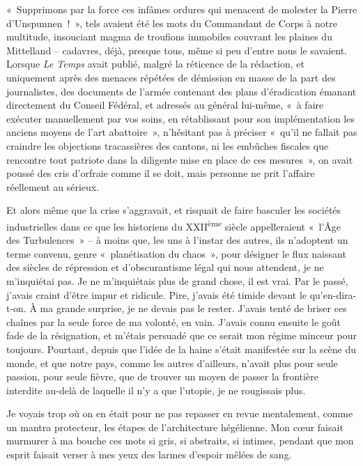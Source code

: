\documentclass[
  extrafontsizes,
  oneside,
  14pt
]{memoir}
\begin{document}
«~Supprimons par la force ces infâmes ordures qui menacent de molester la
Pierre d'Unspunnen~!~», tels avaient été les mots du Commandant de Corps à
notre multitude, insouciant magma de troufions immobiles couvrant les plaines
du Mittelland -- cadavres, déjà, presque tous, même si peu d'entre nous le
savaient. Lorsque \emph{Le Temps} avait publié, malgré la réticence de la
rédaction, et uniquement après des menaces répétées de démission en masse de la
part des journalistes, des documents de l'armée contenant des plans
d'éradication émanant directement du Conseil Fédéral, et adressés au général
lui-même, «~à faire exécuter manuellement par vos soins, en rétablissant pour
son implémentation les anciens moyens de l'art abattoire~», n'hésitant pas à
préciser «~qu'il ne fallait pas craindre les objections tracassières des
cantons, ni les embûches fiscales que rencontre tout patriote dans la diligente
mise en place de ces mesures~», on avait poussé des cris d'orfraie comme il se
doit, mais personne ne prit l'affaire réellement au sérieux.

Et alors même que la crise s'aggravait, et risquait de faire basculer les
sociétés industrielles dans ce que les historiens du XXII\textsuperscript{ème}
siècle appelleraient «~l'Âge des Turbulences~» -- à moins que, les uns à
l'instar des autres, ils n'adoptent un terme convenu, genre «~planétisation du
chaos~», pour désigner le flux naissant des siècles de répression et
d'obscurantisme légal qui nous attendent, je ne m'inquiétai pas. Je ne
m'inquiétais plus de grand chose, il est vrai. Par le passé, j'avais craint
d'être impur et ridicule. Pire, j'avais été timide devant le qu'en-dira-t-on. À
ma grande surprise, je ne devais pas le rester. J'avais tenté de briser ces
chaînes par la seule force de ma volonté, en vain. J'avais connu ensuite le
goût fade de la résignation, et m'étais persuadé que ce serait mon régime
minceur pour toujours. Pourtant, depuis que l'idée de la haine s'était
manifestée sur la scène du monde, et que notre pays, comme les autres
d'ailleurs, n'avait plus pour seule passion, pour seule fièvre, que de trouver
un moyen de passer la frontière interdite au-delà de laquelle il n'y a que
l'utopie, je ne rougissais plus.

Je voyais trop où on en était pour ne pas repasser en revue mentalement, comme
un mantra protecteur, les étapes de l'architecture hégélienne. Mon cœur faisait
murmurer à ma bouche ces mots si gris, si abstraits, si intimes, pendant que
mon esprit faisait verser à mes yeux des larmes d'espoir mêlées de sang.
\end{document}
